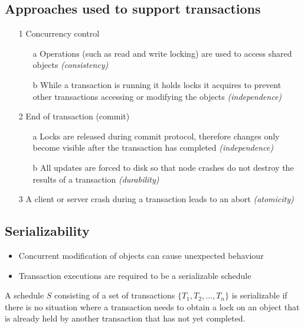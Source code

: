 \documentclass[a4paper]{article}
\begin{document}
\subsection{Approaches used to support transactions}

\begin{enumerate}
  \item[1] Concurrency control
    \begin{enumerate}
      \item[a] Operations (such as read and write locking) are used to access
               shared objects \textit{(consistency)}
      \item[b] While a transaction is running it holds locks it acquires to
               prevent other transactions accessing or modifying the objects
               \textit{(independence)}
    \end{enumerate}

  \item[2] End of transaction (commit)
    \begin{enumerate}
      \item[a] Locks are released during commit protocol, therefore changes only
               become visible after the transaction has completed
               \textit{(independence)}
      \item[b] All updates are forced to disk so that node crashes do not
               destroy the results of a transaction \textit{(durability)}
    \end{enumerate}

  \item[3] A client or server crash during a transaction leads to an abort
           \textit{(atomicity)}
\end{enumerate}

\subsection{Serializability}

\begin{itemize}
  \item Concurrent modification of objects can cause unexpected behaviour
  \item Transaction executions are required to be a serializable schedule
\end{itemize}

A schedule $S$ consisting of a set of transactions $\{T_{1}, T_{2}, \ldots,
T_{n}\}$ is serializable if there is no situation where a transaction needs to
obtain a lock on an object that is already held by another transaction that has
not yet completed.
\end{document}
